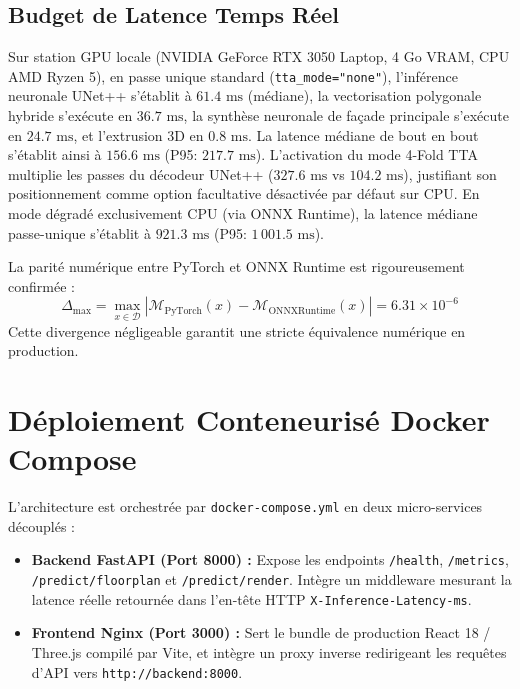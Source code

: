 \documentclass[11pt,a4paper]{report}
\begin{document}
\subsection{Budget de Latence Temps Réel}
Sur station GPU locale (NVIDIA GeForce RTX 3050 Laptop, 4 Go VRAM, CPU AMD Ryzen 5), en passe unique standard (\texttt{tta\_mode="none"}), l'inférence neuronale UNet++ s'établit à $61.4\text{ ms}$ (médiane), la vectorisation polygonale hybride s'exécute en $36.7\text{ ms}$, la synthèse neuronale de façade principale s'exécute en $24.7\text{ ms}$, et l'extrusion 3D en $0.8\text{ ms}$. La latence médiane de bout en bout s'établit ainsi à \textbf{$156.6\text{ ms}$} (P95: $217.7\text{ ms}$). L'activation du mode 4-Fold TTA multiplie les passes du décodeur UNet++ ($327.6\text{ ms}$ vs $104.2\text{ ms}$), justifiant son positionnement comme option facultative désactivée par défaut sur CPU. En mode dégradé exclusivement CPU (via ONNX Runtime), la latence médiane passe-unique s'établit à $921.3\text{ ms}$ (P95: $1\,001.5\text{ ms}$).

La parité numérique entre PyTorch et ONNX Runtime est rigoureusement confirmée :
\begin{equation}
    \Delta_{\max} = \max_{x \in \mathcal{D}} | \mathcal{M}_{\text{PyTorch}}(x) - \mathcal{M}_{\text{ONNXRuntime}}(x) | = 6.31 \times 10^{-6}
\end{equation}
Cette divergence négligeable garantit une stricte équivalence numérique en production.

\section{Déploiement Conteneurisé Docker Compose}
L'architecture est orchestrée par \texttt{docker-compose.yml} en deux micro-services découplés :
\begin{itemize}
    \item \textbf{Backend FastAPI (Port 8000) :} Expose les endpoints \texttt{/health}, \texttt{/metrics}, \texttt{/predict/floorplan} et \texttt{/predict/render}. Intègre un middleware mesurant la latence réelle retournée dans l'en-tête HTTP \texttt{X-Inference-Latency-ms}.
    \item \textbf{Frontend Nginx (Port 3000) :} Sert le bundle de production React 18 / Three.js compilé par Vite, et intègre un proxy inverse redirigeant les requêtes d'API vers \texttt{http://backend:8000}.
\end{itemize}

\newpage
\end{document}
